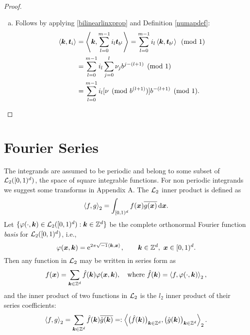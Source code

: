 \documentclass[graybox,footinfo]{svmult}
\newcommand{\Z}{\mathbb{Z}} %
\newcommand{\bst}{\boldsymbol{t}}    %
\newcommand{\bsx}{\boldsymbol{x}}    %
\begin{document}
\begin{proof}
\begin{enumerate}[a)]
\item Follows by applying  \eqref{bilinearlinxprop} and Definition \ref{numapdef}:
\begin{align*}
\ip{\bsk}{\bst_i} &= \ip{\bsk}{\sum_{l=0}^{m-1} i_l \bst_{b^{l}}} = \sum_{l=0}^{m-1} i_l \ip{\bsk}{\bst_{b^{l}}} \pmod 1 \\
& = \sum_{l=0}^{m-1} i_l \sum_{j=0}^{l} \nu_jb^{j-(l+1)} \pmod 1\\
&=\sum_{l=0}^{m-1} i_l [\nu \pmod  {b^{(l+1)}}]  b^{-(l+1)} \pmod 1.
\end{align*}

\end{enumerate}
\end{proof}

\section{Fourier Series}

The integrands are assumed to be periodic and belong to some subset of $\mathcal{L}_2([0,1)^d)$, the space of square integrable functions. For non periodic integrands we suggest some transforms in Appendix A. The $\mathcal{L}_2$ inner product is defined as
\[
\ip[2]{f}{g} = \int_{\cube} f(\bsx) \overline{g(\bsx)} \, \dif \bsx.
\]
Let $\{\varphi(\cdot,\bsk) \in \cl_2(\cube) : \bsk \in \Z^d\}$ be the complete orthonormal Fourier function \emph{basis} for $\mathcal{L}_2([0,1)^d)$, i.e.,
\[
\varphi(\bsx,\bsk)  = \me^{2 \pi \sqrt{-1} \ip{\bsk}{\bsx}}, \qquad \bsk \in \Z^d, \ \bsx \in \cube.
\]
Then any function in $\mathcal{L}_2$ may be written in series form as
\begin{equation} \label{Fourierdef}
f(\bsx) = \sum_{\bsk \in \Z^d} \hf(\bsk) \varphi(\bsx,\bsk), \quad \text{where } \hf(\bsk) = \ip[2]{f}{\varphi(\cdot,\bsk)},
\end{equation}
and the inner product of two functions in $\mathcal{L}_2$ is the $l_2$ inner product of their series coefficients:
\[
\ip[2]{f}{g} = \sum_{\bsk \in \Z^d} \hf(\bsk)\overline{\hg(\bsk)} =: \ip[2]{\bigl(\hf(\bsk)\bigr)_{\bsk \in \Z^d}}{\bigl ( \hg(\bsk)\bigr )_{\bsk \in \Z^d}}.
\]
\end{document}
